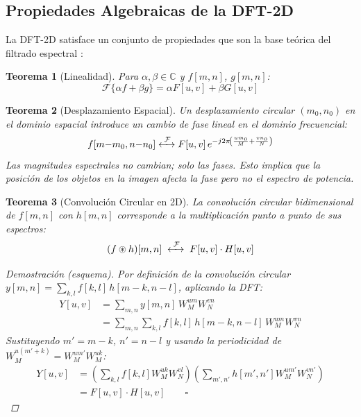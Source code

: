 \documentclass[conference]{IEEEtran}
\newtheorem{teorema}{Teorema}
\begin{document}
\subsection{Propiedades Algebraicas de la DFT-2D}

La DFT-2D satisface un conjunto de propiedades que son la base teórica
del filtrado espectral \cite{oppenheim1999, gonzalez2018}:

\begin{teorema}[Linealidad]
  Para $\alpha, \beta \in \mathbb{C}$ y $f[m,n]$, $g[m,n]$:
  \begin{equation}
    \mathcal{F}\{\alpha f + \beta g\} = \alpha F[u,v] + \beta G[u,v]
    \label{eq:linealidad}
  \end{equation}
\end{teorema}

\begin{teorema}[Desplazamiento Espacial]
  Un desplazamiento circular $(m_0, n_0)$ en el dominio espacial
  introduce un cambio de fase lineal en el dominio frecuencial:
  \begin{equation}
    f[m{-}m_0, n{-}n_0] \xleftrightarrow{\;\mathcal{F}\;}
    F[u,v]\,e^{-j2\pi\!\left(\frac{um_0}{M}+\frac{vn_0}{N}\right)}
    \label{eq:desplazamiento}
  \end{equation}
  Las magnitudes espectrales no cambian; solo las fases. Esto implica que
  la posición de los objetos en la imagen afecta la fase pero no el espectro
  de potencia.
\end{teorema}

\begin{teorema}[Convolución Circular en 2D]
  \label{teo:conv}
  La convolución circular bidimensional de $f[m,n]$ con $h[m,n]$
  corresponde a la multiplicación punto a punto de sus espectros:
  \begin{equation}
    (f \circledast h)[m,n]
    \;\xleftrightarrow{\;\mathcal{F}\;}\;
    F[u,v]\cdot H[u,v]
    \label{eq:conv_theorem}
  \end{equation}
  \begin{proof}[Demostración (esquema)]
    Por definición de la convolución circular $y[m,n] = \sum_{k,l} f[k,l]\,h[m{-}k,n{-}l]$,
    aplicando la DFT:
    \begin{align*}
      Y[u,v] &= \sum_{m,n} y[m,n]\,W_M^{um}W_N^{vn} \\
             &= \sum_{m,n}\sum_{k,l} f[k,l]\,h[m{-}k,n{-}l]\,W_M^{um}W_N^{vn}
    \end{align*}
    Sustituyendo $m'=m{-}k$, $n'=n{-}l$ y usando la periodicidad de
    $W_M^{u(m'+k)} = W_M^{um'}W_M^{uk}$:
    \begin{align*}
      Y[u,v] &= \left(\sum_{k,l}f[k,l]W_M^{uk}W_N^{vl}\right)
               \left(\sum_{m',n'}h[m',n']W_M^{um'}W_N^{vn'}\right) \\
             &= F[u,v]\cdot H[u,v] \qquad \square
    \end{align*}
  \end{proof}
\end{teorema}
\end{document}
